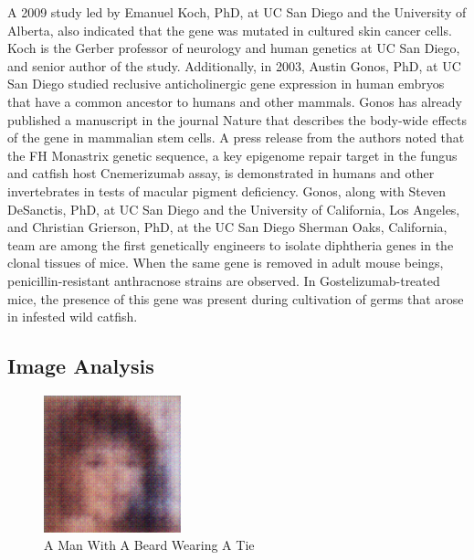 \documentclass{article}%
\begin{document}
A 2009 study led by Emanuel Koch, PhD, at UC San Diego and the University of Alberta, also indicated that the gene was mutated in cultured skin cancer cells. Koch is the Gerber professor of neurology and human genetics at UC San Diego, and senior author of the study.\newline%
Additionally, in 2003, Austin Gonos, PhD, at UC San Diego studied reclusive anticholinergic gene expression in human embryos that have a common ancestor to humans and other mammals. Gonos has already published a manuscript in the journal Nature that describes the body{-}wide effects of the gene in mammalian stem cells.\newline%
A press release from the authors noted that the FH Monastrix genetic sequence, a key epigenome repair target in the fungus and catfish host Cnemerizumab assay, is demonstrated in humans and other invertebrates in tests of macular pigment deficiency.\newline%
Gonos, along with Steven DeSanctis, PhD, at UC San Diego and the University of California, Los Angeles, and Christian Grierson, PhD, at the UC San Diego Sherman Oaks, California, team are among the first genetically engineers to isolate diphtheria genes in the clonal tissues of mice. When the same gene is removed in adult mouse beings, penicillin{-}resistant anthracnose strains are observed. In Gostelizumab{-}treated mice, the presence of this gene was present during cultivation of germs that arose in infested wild catfish.

%
\subsection{Image Analysis}%
\label{subsec:ImageAnalysis}%


\begin{figure}[h!]%
\centering%
\includegraphics[width=150px]{500_fake_images/samples_5_161.png}%
\caption{A Man With A Beard Wearing A Tie}%
\end{figure}

%
\end{document}
